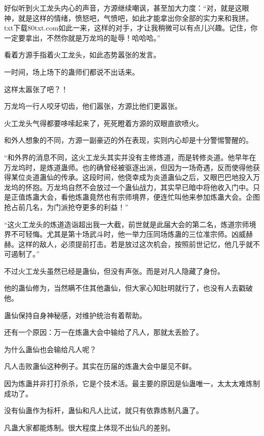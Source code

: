 
\begin{this_body}

好似听到火工龙头内心的声音，方源继续嘲讽，甚至加大力度：“对，就是这眼神，就是这样的情绪，愤怒吧，气愤吧，如此才能拿出你全部的实力来和我拼。txt下载80txt.com如此一来，这样的对手，才让我稍微可以有点儿兴趣。记住，你一定要拿出，不然你就是万龙坞的耻辱！哈哈哈。”

看着方源手指着火工龙头，如此态势嚣张的发言。

一时间，场上场下的蛊师们都说不出话来。

这样太嚣张了吧？！

万龙坞一行人咬牙切齿，他们嚣张，方源比他们更嚣张。

火工龙头气得都要哆嗦起来了，死死瞪着方源的双眼直欲喷火。

和外人想象的不同，方源一副豪迈的外在表现，实则内心却是十分警惕警醒的。

“和外界的消息不同，这火工龙头其实并没有主修炼道，而是转修炎道。他早年在万龙坞时，是炼道蛊师。也的确曾经被驱逐出派，但因为一场奇遇，反而使得他获得某位炎道蛊仙的传承。这段时间，他侥幸成为炎道蛊仙之后，又眼巴巴地投入万龙坞的怀抱。万龙坞自然不会放过一个蛊仙战力，其实早已暗中将他收入门中。只是正值炼蛊大会，看他炼蛊竟然也有宗师境界，便连忙叫他来参加炼蛊大会。企图抢占前几名，为门派抢夺更多的利益！”

“这火工龙头的炼道造诣超出我一大截，前世就是此届大会的第二名，炼道宗师境界不可轻悔。尤其是第十场武斗时，他一举力压同场炼蛊的三位准宗师。凶威赫赫。这样的敌人，必须提前打击。若是放过这次机会，按照前世记忆，他几乎就不可遏制了。”

不过火工龙头虽然已经是蛊仙，但没有声张。而是对凡人隐藏了身份。

他的蛊仙修为，当然瞒不住其他蛊仙，但大家心知肚明就行了，也没有人去戳破他。

蛊仙保持自身神秘感，对维护统治有着帮助。

还有一个原因：万一在炼蛊大会中输给了凡人，那就太丢脸了。

为什么蛊仙也会输给凡人呢？

凡人击败蛊仙这种例子。其实在历届的炼蛊大会中屡见不鲜。

因为炼蛊并非打打杀杀，它是个技术活。最主要的原因是仙蛊唯一，太太太难炼制成功了。

没有仙蛊作为标杆，蛊仙和凡人比试，就只有依靠炼制凡蛊了。

凡蛊大家都能炼制。很大程度上体现不出仙凡的差别。


\end{this_body}
